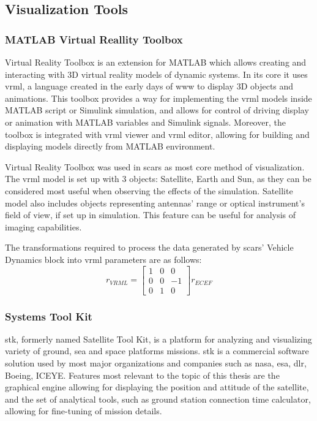 \subsection{Visualization Tools}\label{sec:visualization}
    \subsubsection{MATLAB Virtual Reallity Toolbox}
        Virtual Reality Toolbox is an extension for MATLAB which allows creating and interacting with 3D virtual reality models of dynamic systems. In its core it uses \ac{vrml}, a language created in the early days of \ac{www} to display 3D objects and animations. This toolbox provides a way for implementing the \ac{vrml} models inside MATLAB script or Simulink simulation, and allows for control of driving display or animation with MATLAB variables and Simulink signals. Moreover, the toolbox is integrated with \ac{vrml} viewer and \ac{vrml} editor, allowing for building and displaying models directly from MATLAB environment.

        Virtual Reality Toolbox was used in \ac{scars} as most core method of visualization. The \ac{vrml} model is set up with 3 objects: Satellite, Earth and Sun, as they can be considered most useful when observing the effects of the simulation. Satellite model also includes objects representing antennas' range or optical instrument's field of view, if set up in simulation. This feature can be useful for analysis of imaging capabilities.

        The transformations required to process the data generated by \ac{scars}' Vehicle Dynamics block into \ac{vrml} parameters are as follows:
        \begin{equation}
            r_{VRML}=
            \begin{bmatrix}
            1&0&0\\ 
            0&0&-1\\ 
            0&1&0
            \end{bmatrix}
            r_{ECEF}
        \end{equation}
        
        

    \subsubsection{Systems Tool Kit}
        \ac{stk}, formerly named Satellite Tool Kit, is a platform for analyzing and visualizing variety of ground, sea and space platforms missions. \ac{stk} is a commercial software solution used by most major organizations and companies such as \ac{nasa}, \ac{esa}, \ac{dlr}, Boeing, ICEYE. Features most relevant to the topic of this thesis are the graphical engine allowing for displaying the position and attitude of the satellite, and the set of analytical tools, such as ground station connection time calculator, allowing for fine-tuning of mission details.

